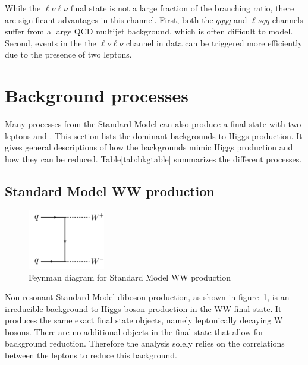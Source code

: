 While the $\ell\nu\ell\nu$ final state is not a large fraction of the branching ratio, there are significant advantages in this channel. First, both the $qqqq$ and $\ell\nu qq$ channels suffer from a large QCD multijet background, which is often difficult to model. Second, events in the the $\ell\nu\ell\nu$ channel in data can be triggered more efficiently due to the presence of two leptons. 

\section{Background processes}

Many processes from the Standard Model can also produce a final state with two leptons and \met. This section lists the dominant backgrounds to Higgs production. It gives general descriptions of how the backgrounds mimic Higgs production and how they can be reduced. Table\ref{tab:bkgtable} summarizes the different processes. 

\subsection{Standard Model WW production}

\begin{figure}[h!]
  \centering
  \captionsetup{justification=centering}

  \includegraphics[width=0.3\textwidth]{figures/Feyn_SMWW}
  \caption{Feynman diagram for Standard Model WW production}
  \label{fig:SMWWdiagram}
\end{figure}

Non-resonant Standard Model diboson production, as shown in figure~\ref{fig:SMWWdiagram}, is an irreducible background to Higgs boson production in the WW final state. It produces the same exact final state objects, namely leptonically decaying W bosons. There are no additional objects in the final state that allow for background reduction. Therefore the analysis solely relies on the correlations between the leptons to reduce this background. 

